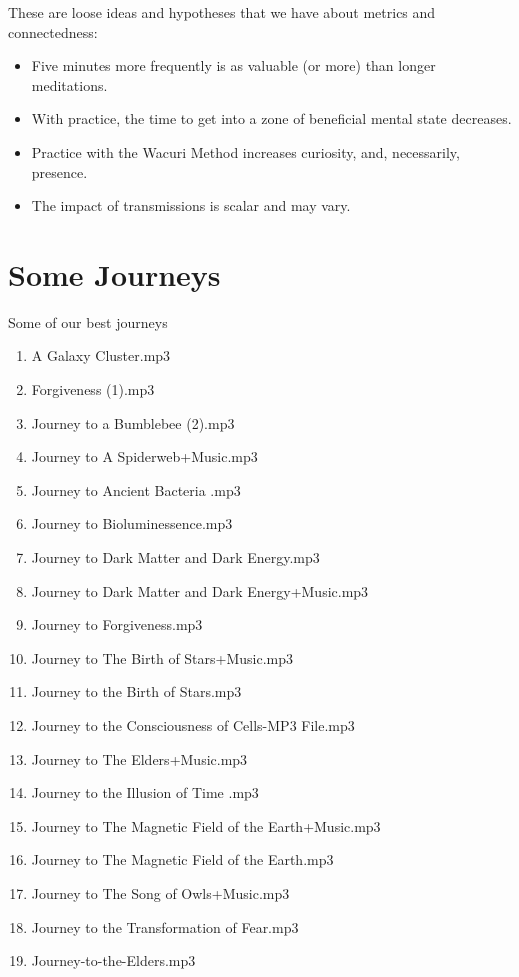 \documentclass[12pt]{book}
\begin{document}
These are loose ideas and hypotheses that we have about metrics and connectedness:
\begin{itemize}
\item Five minutes more frequently is as valuable (or more) than longer meditations.
\item With practice, the time to get into a zone of beneficial mental state decreases.
\item Practice with the Wacuri Method increases curiosity, and, necessarily, presence.
  \item The impact of transmissions is scalar and may vary.
\end{itemize}



\appendix

\chapter{Some Journeys}
\label{sec:journeys}

Some of our best journeys
\begin{enumerate}
\item A Galaxy Cluster.mp3
\item Forgiveness (1).mp3
\item Journey to a Bumblebee (2).mp3
\item Journey to A Spiderweb+Music.mp3
\item Journey to Ancient Bacteria .mp3
\item Journey to Bioluminessence.mp3
\item Journey to Dark Matter and Dark Energy.mp3
\item Journey to Dark Matter and Dark Energy+Music.mp3
\item Journey to Forgiveness.mp3
\item Journey to The Birth of Stars+Music.mp3
\item Journey to the Birth of Stars.mp3
\item Journey to the Consciousness of Cells-MP3 File.mp3
\item Journey to The Elders+Music.mp3
\item Journey to the Illusion of Time .mp3
\item Journey to The Magnetic Field of the Earth+Music.mp3
\item Journey to The Magnetic Field of the Earth.mp3
\item Journey to The Song of Owls+Music.mp3
\item Journey to the Transformation of Fear.mp3
\item Journey-to-the-Elders.mp3
\end{enumerate}

\printbibliography

  
\end{document}
